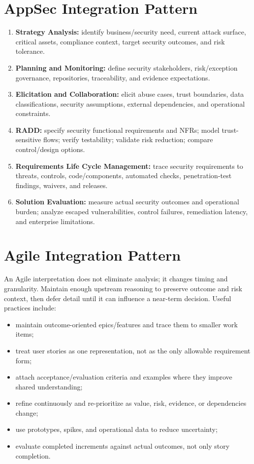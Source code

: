\documentclass[11pt]{article}
\begin{document}
\section{AppSec Integration Pattern}
\begin{enumerate}
\item \textbf{Strategy Analysis:} identify business/security need, current attack surface, critical assets, compliance context, target security outcomes, and risk tolerance.
\item \textbf{Planning and Monitoring:} define security stakeholders, risk/exception governance, repositories, traceability, and evidence expectations.
\item \textbf{Elicitation and Collaboration:} elicit abuse cases, trust boundaries, data classifications, security assumptions, external dependencies, and operational constraints.
\item \textbf{RADD:} specify security functional requirements and NFRs; model trust-sensitive flows; verify testability; validate risk reduction; compare control/design options.
\item \textbf{Requirements Life Cycle Management:} trace security requirements to threats, controls, code/components, automated checks, penetration-test findings, waivers, and releases.
\item \textbf{Solution Evaluation:} measure actual security outcomes and operational burden; analyze escaped vulnerabilities, control failures, remediation latency, and enterprise limitations.
\end{enumerate}
\section{Agile Integration Pattern}
An Agile interpretation does not eliminate analysis; it changes timing and granularity. Maintain enough upstream reasoning to preserve outcome and risk context, then defer detail until it can influence a near-term decision. Useful practices include:
\begin{itemize}
\item maintain outcome-oriented epics/features and trace them to smaller work items;
\item treat user stories as one representation, not as the only allowable requirement form;
\item attach acceptance/evaluation criteria and examples where they improve shared understanding;
\item refine continuously and re-prioritize as value, risk, evidence, or dependencies change;
\item use prototypes, spikes, and operational data to reduce uncertainty;
\item evaluate completed increments against actual outcomes, not only story completion.
\end{itemize}
\end{document}
